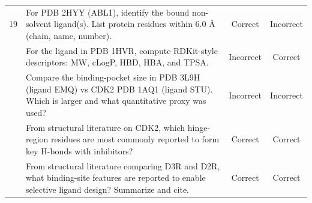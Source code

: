 \documentclass{article}
\begin{document}
\begin{table}[h]
\begin{tabularx}{\textwidth}{p{0.5cm} X c c}
19 & For PDB 2HYY (ABL1), identify the bound non-solvent ligand(s). List protein residues within 6.0 \AA{} (chain, name, number). & Correct & Incorrect \\ \addlinespace
20 & For the ligand in PDB 1HVR, compute RDKit-style descriptors: MW, cLogP, HBD, HBA, and TPSA. & Incorrect & Correct \\ \addlinespace
21 & Compare the binding-pocket size in PDB 3L9H (ligand EMQ) vs CDK2 PDB 1AQ1 (ligand STU). Which is larger and what quantitative proxy was used? & Incorrect & Incorrect \\ \addlinespace
22 & From structural literature on CDK2, which hinge-region residues are most commonly reported to form key H-bonds with inhibitors? & Correct & Correct \\ \addlinespace
23 & From structural literature comparing D3R and D2R, what binding-site features are reported to enable selective ligand design? Summarize and cite. & Correct & Correct \\
\bottomrule
\end{tabularx}
\end{table}
\end{document}
